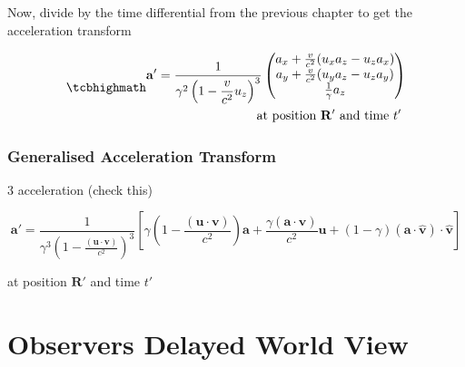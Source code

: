 Now, divide by the time differential from the previous chapter to get the acceleration transform

\begin{equation}
	\mhl{
		\begin{aligned}
			\mathbf{a}{'} = \dfrac{1}{{\gamma}^2\left(1- \dfrac{v}{c^2} {{u}_{z}}\right)^3 }
			\begin{pmatrix}
				{{a}_{x}} + \frac{v}{c^2}({{u}_{x}} {{a}_{z}} - {{u}_{z}} {{a}_{x}}) \\
				{{a}_{y}} + \frac{v}{c^2}({{u}_{y}} {{a}_{z}} - {{u}_{z}} {{a}_{y}}) \\
				\frac{1}{{\gamma}} {{a}_{z}}                 \\
			\end{pmatrix}
			\\
			\text{at position $\mathbf{R}{'}$ and time $t{'}$ }
		\end{aligned}
	}
\end{equation}

\subsection{Generalised Acceleration Transform}

3 acceleration (check this)

\begin{equation}
	\mathbf{a{'}} = \frac{1}{{\gamma} ^3 \left(1-\frac{(\mathbf{u}\cdot \mathbf{v})}{c^2}\right)^3}\left[ {\gamma} \left(1-\frac{(\mathbf{u}\cdot\mathbf{v})}{c^2}\right)\mathbf{a}+\frac{{\gamma} (\mathbf{a}\cdot\mathbf{v})}{c^2}\mathbf{u} + (1-{\gamma} ) (\mathbf{a}\cdot\hat{\mathbf{v}}) \cdot\hat{\mathbf{v}}\right]
\end{equation}

at position $\mathbf{R}{'}$ and time $t{'}$



\chapter{Observers Delayed World View}

